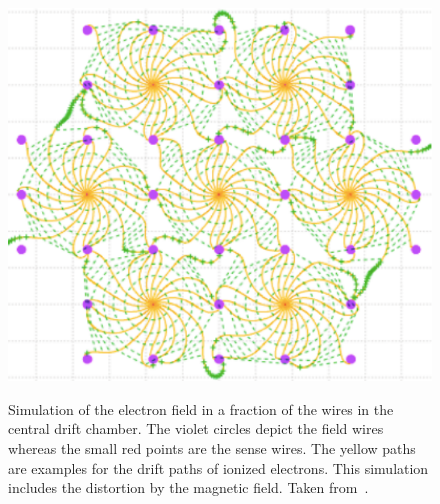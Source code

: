 \begin{figure}
  \caption[Simulation of the electron field in the central drift chamber.]{Simulation of the electron field in a fraction of the wires in the central drift chamber. The violet circles depict the field wires whereas the small red points are the sense wires. The yellow paths are examples for the drift paths of ionized electrons. This simulation includes the distortion by the magnetic field. Taken from~\cite{cdc_design}.}
  \includegraphics[width=0.5\linewidth]{figures/experimental_setup/electronsInCDC.pdf}
  \label{fig-sense-wires}
\end{figure}

